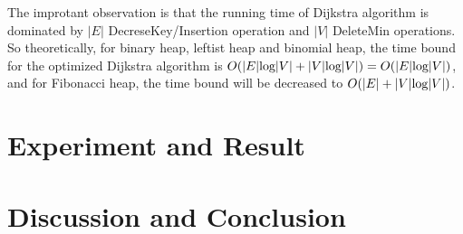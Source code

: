 \documentclass[12pt]{article}
\begin{document}
    The improtant observation is that the running time of Dijkstra algorithm 
    is dominated by $|E|$ DecreseKey/Insertion operation and $|V|$ DeleteMin 
    operations. So theoretically, for binary heap, leftist heap and binomial 
    heap, the time bound for the optimized Dijkstra algorithm is 
    $O(|E|\textup{log}|V| + |V|\textup{log}|V|) = O(|E|\textup{log}|V|)$, and for Fibonacci heap, 
    the time bound will be decreased to $O(|E| + |V|\textup{log}|V|)$.

    \section{Experiment and Result}
        
    \section{Discussion and Conclusion}
        
\end{document}
